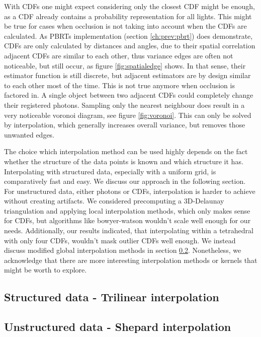 With CDFs one might expect considering only the closest CDF might be enough, as a CDF already contains a probability representation for all lights. This might be true for cases when occlusion is not taking into account when the CDFs are calculated. As PBRTs implementation (section \ref{ch:prev:pbrt}) does demonstrate, CDFs are only calculated by distances and angles, due to their spatial correlation adjacent CDFs are similar to each other, thus variance edges are often not noticeable, but still occur, as figure \ref{fig:spatialedge} shows. In that sense, their estimator function is still discrete, but adjacent estimators are by design similar to each other most of the time. This is not true anymore when occlusion is factored in. A single object between two adjacent CDFs could completely change their registered photons. Sampling only the nearest neighbour does result in a very noticeable voronoi diagram, see figure \ref{fig:voronoi}. This can only be solved by interpolation, which generally increases overall variance, but removes those unwanted edges.

The choice which interpolation method can be used highly depends on the fact whether the structure of the data points is known and which structure it has. Interpolating with structured data, especially with a uniform grid, is comparatively fast and easy. We discuss our approach in the following section. For unstructured data, either photons or CDFs, interpolation is harder to achieve without creating artifacts. We considered precomputing a 3D-Delaunay triangulation and applying local interpolation methods, which only makes sense for CDFs, but algorithms like bowyer-watson wouldn't scale well enough for our needs. Additionally, our results indicated, that interpolating within a tetrahedral with only four CDFs, wouldn't mask outlier CDFs well enough. We instead discuss modified global interpolation methods in section \ref{ch:unstructured}. Nonetheless, we acknowledge that there are more interesting interpolation methods or kernels that might be worth to explore.

\subsection{Structured data - Trilinear interpolation}
\label{ch:trilinear}

\subsection{Unstructured data - Shepard interpolation}
\label{ch:unstructured}


